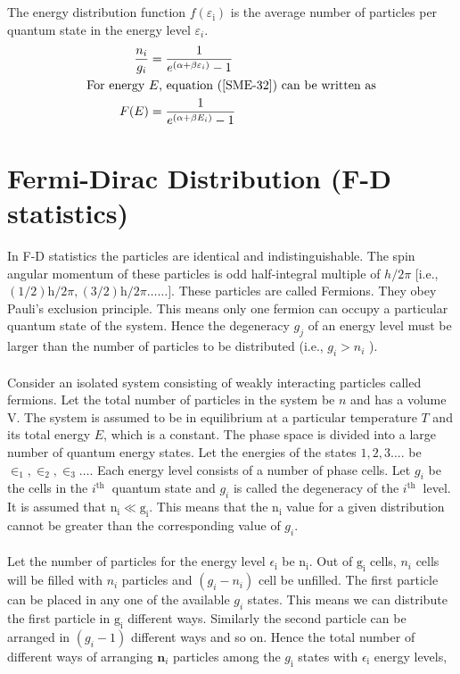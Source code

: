 \section{}
The energy distribution function $f\left(\varepsilon_{\mathrm{i}}\right)$ is the average number of particles per quantum state in the energy level $\varepsilon_{i}$.
\begin{align}
\frac{n_{i}}{g_{i}}&=\frac{1}{e^{\left(\alpha+\beta \varepsilon_{i}\right)}-1}\label{SME-32}\\
\text { For energy } &E \text {, equation (\ref{SME-32}) can be written as }\notag\\
F(E)&=\frac{1}{e^{\left(\alpha+\beta E_{i}\right)}-1}\notag
\end{align}
\section{Fermi-Dirac Distribution (F-D statistics)}
In F-D statistics the particles are identical and indistinguishable. The spin angular momentum of these particles is odd half-integral multiple of $h / 2 \pi$ [i.e., $(1 / 2) \mathrm{h} / 2 \pi,(3 / 2) \mathrm{h} / 2 \pi \ldots \ldots]$. These particles are called Fermions. They obey Pauli's exclusion principle. This means only one fermion can occupy a particular quantum state of the system. Hence the degeneracy $g_{j}$ of an energy level must be larger than the number of particles to be distributed (i.e., $g_{i}>n_{i}$ ).\\\\
Consider an isolated system consisting of weakly interacting particles called fermions. Let the total number of particles in the system be $n$ and has a volume $\mathrm{V}$. The system is assumed to be in equilibrium at a particular temperature $T$ and its total energy $E$, which is a constant. The phase space is divided into a large number of quantum energy states. Let the energies of the states $1,2,3 \ldots .$ be $\in_{1}, \in_{2}, \in_{3} \ldots$. Each energy level consists of a number of phase cells. Let $g_{i}$ be the cells in the $i^{\text {th }}$ quantum state and $g_{i}$ is called the degeneracy of the $i^{\text {th }}$ level. It is assumed that $\mathrm{n}_{\mathrm{i}} \ll \mathrm{g}_{\mathrm{i}}$. This means that the $\mathrm{n}_{\mathrm{i}}$ value for a given distribution cannot be greater than the corresponding value of $g_{i}$.\\\\
Let the number of particles for the energy level $\epsilon_{\mathrm{i}}$ be $\mathrm{n}_{\mathrm{i}}$. Out of $\mathrm{g}_{\mathrm{i}}$ cells, $n_{i}$ cells will be filled with $n_{i}$ particles and $\left(g_{i}-n_{i}\right)$ cell be unfilled. The first particle can be placed in any one of the available $g_{i}$ states. This means we can distribute the first particle in $\mathrm{g}_{\mathrm{i}}$ different ways. Similarly the second particle can be arranged in $\left(g_{i}-1\right)$ different ways and so on. Hence the total number of different ways of arranging $\mathbf{n}_{i}$ particles among the $g_{\mathrm{i}}$ states with $\epsilon_{\mathrm{i}}$ energy levels,

